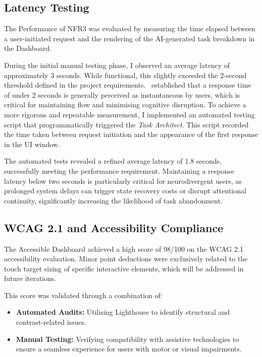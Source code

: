 \subsection{Latency Testing}
The Performance of NFR3 was evaluated by measuring the time elapsed between a user-initiated request and the rendering of the \gls{AI}-generated task breakdown in the Dashboard.

During the initial manual testing phase, I observed an average latency of approximately 3 seconds. While functional, this slightly exceeded the 2-second 
threshold defined in the project requirements.~\textcite{nielsen1994usability} established that a response time of under 2 seconds is generally perceived 
as instantaneous by users, which is critical for maintaining flow and minimising cognitive disruption.
 To achieve a more rigorous and repeatable measurement, I implemented an automated testing 
script that programmatically triggered the \textit{Task Architect}. This script recorded the time taken between request initiation and the 
appearance of the first response in the \gls{UI} window.


The automated tests revealed a refined average latency of 1.8 seconds, successfully meeting the performance requirement. Maintaining a 
response latency below two seconds is particularly critical for neurodivergent users, as prolonged system delays can trigger state recovery 
costs or disrupt attentional continuity, significantly increasing the likelihood of task abandonment.

\subsection{\gls{WCAG} 2.1 and Accessibility Compliance}
The Accessible Dashboard achieved a high score of 98/100 on the \gls{WCAG} 2.1 accessibility evaluation. Minor point deductions were exclusively 
related to the touch target sizing of specific interactive elements, which will be addressed in future iterations.  

This score was validated through a combination of:
\begin{itemize}
    \item \textbf{Automated Audits:} Utilising Lighthouse to identify structural and contrast-related issues.  
    \item \textbf{Manual Testing:} Verifying compatibility with assistive technologies to ensure a seamless experience for users with motor or visual impairments.  
\end{itemize}

